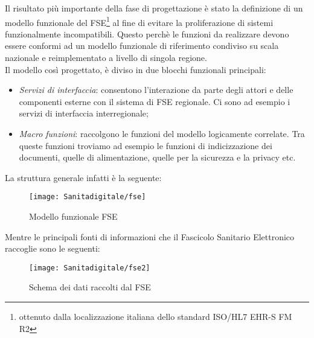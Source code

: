 Il risultato più importante della fase di progettazione è stato la definizione di un modello funzionale del FSE\footnote{ ottenuto dalla localizzazione italiana dello standard ISO/HL7 EHR-S FM R2} al fine di evitare la proliferazione di sistemi funzionalmente incompatibili. Questo perchè le funzioni da realizzare devono essere conformi ad un modello funzionale di riferimento condiviso su scala nazionale e reimplementato a livello di singola regione. \\
Il modello così progettato, è diviso in due blocchi funzionali principali:
\begin{itemize}
	\item \emph{Servizi di interfaccia}: consentono l’interazione da parte degli attori e delle componenti esterne con il sistema di FSE regionale. Ci sono ad esempio i servizi di interfaccia interregionale;
	\item \emph{Macro funzioni}: raccolgono le funzioni del modello logicamente correlate. Tra queste funzioni troviamo ad esempio le funzioni di indicizzazione dei documenti, quelle di alimentazione, quelle per la sicurezza e la privacy etc.
\end{itemize}
La struttura generale infatti è la seguente:
%
\begin{center}
	\begin{figure}[tbhp]
		\centering
		\texttt{[image: Sanitadigitale/fse]}
		\caption{Modello funzionale FSE}
		\label{fig:modelloFSE}
	\end{figure}
\end{center}
%
Mentre le principali fonti di informazioni che il Fascicolo Sanitario Elettronico raccoglie sono le seguenti:
%
\begin{center}
	\begin{figure}[tbhp]
		\centering
		\texttt{[image: Sanitadigitale/fse2]}
		\caption{Schema dei dati raccolti dal FSE}
		\label{fig:schema dati fse}
	\end{figure}
\end{center}
%
